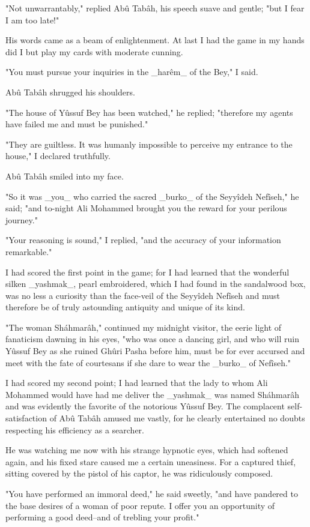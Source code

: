 "Not unwarrantably," replied Abû Tabâh, his speech suave and gentle;
"but I fear I am too late!"

His words came as a beam of enlightenment. At last I had the game in
my hands did I but play my cards with moderate cunning.

"You must pursue your inquiries in the _harêm_ of the Bey," I said.

Abû Tabâh shrugged his shoulders.

"The house of Yûssuf Bey has been watched," he replied; "therefore my
agents have failed me and must be punished."

"They are guiltless. It was humanly impossible to perceive my entrance
to the house," I declared truthfully.

Abû Tabâh smiled into my face.

"So it was _you_ who carried the sacred _burko_ of the Seyyîdeh
Nefîseh," he said; "and to-night Ali Mohammed brought you the reward
for your perilous journey."

"Your reasoning is sound," I replied, "and the accuracy of your
information remarkable."

I had scored the first point in the game; for I had learned that the
wonderful silken _yashmak_, pearl embroidered, which I had found in
the sandalwood box, was no less a curiosity than the face-veil of the
Seyyîdeh Nefîseh and must therefore be of truly astounding antiquity
and unique of its kind.

"The woman Sháhmarâh," continued my midnight visitor, the eerie light
of fanaticism dawning in his eyes, "who was once a dancing girl, and
who will ruin Yûssuf Bey as she ruined Ghûri Pasha before him, must be
for ever accursed and meet with the fate of courtesans if she dare to
wear the _burko_ of Nefîseh."

I had scored my second point; I had learned that the lady to whom Ali
Mohammed would have had me deliver the _yashmak_ was named Sháhmarâh
and was evidently the favorite of the notorious Yûssuf Bey. The
complacent self-satisfaction of Abû Tabâh amused me vastly, for he
clearly entertained no doubts respecting his efficiency as a searcher.

He was watching me now with his strange hypnotic eyes, which had
softened again, and his fixed stare caused me a certain uneasiness.
For a captured thief, sitting covered by the pistol of his captor,
he was ridiculously composed.

"You have performed an immoral deed," he said sweetly, "and have
pandered to the base desires of a woman of poor repute. I offer you an
opportunity of performing a good deed--and of trebling your profit."

